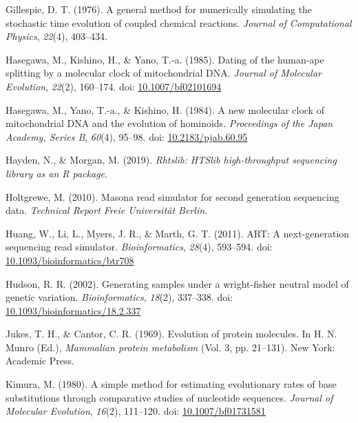 \documentclass[12pt,]{article}
\begin{document}
\leavevmode\hypertarget{ref-Gillespie_1976}{}%
Gillespie, D. T. (1976). A general method for numerically simulating the stochastic time evolution of coupled chemical reactions. \emph{Journal of Computational Physics}, \emph{22}(4), 403--434.

\leavevmode\hypertarget{ref-Hasegawa_1985}{}%
Hasegawa, M., Kishino, H., \& Yano, T.-a. (1985). Dating of the human-ape splitting by a molecular clock of mitochondrial DNA. \emph{Journal of Molecular Evolution}, \emph{22}(2), 160--174. doi: \href{https://doi.org/10.1007/bf02101694}{10.1007/bf02101694}

\leavevmode\hypertarget{ref-Hasegawa_1984}{}%
Hasegawa, M., Yano, T.-a., \& Kishino, H. (1984). A new molecular clock of mitochondrial DNA and the evolution of hominoids. \emph{Proceedings of the Japan Academy, Series B}, \emph{60}(4), 95--98. doi: \href{https://doi.org/10.2183/pjab.60.95}{10.2183/pjab.60.95}

\leavevmode\hypertarget{ref-Hayden_2019}{}%
Hayden, N., \& Morgan, M. (2019). \emph{Rhtslib: HTSlib high-throughput sequencing library as an R package}.

\leavevmode\hypertarget{ref-Holtgrewe_2010}{}%
Holtgrewe, M. (2010). Masona read simulator for second generation sequencing data. \emph{Technical Report Freie Universität Berlin}.

\leavevmode\hypertarget{ref-Huang_2011}{}%
Huang, W., Li, L., Myers, J. R., \& Marth, G. T. (2011). ART: A next-generation sequencing read simulator. \emph{Bioinformatics}, \emph{28}(4), 593--594. doi: \href{https://doi.org/10.1093/bioinformatics/btr708}{10.1093/bioinformatics/btr708}

\leavevmode\hypertarget{ref-Hudson_2002}{}%
Hudson, R. R. (2002). Generating samples under a wright-fisher neutral model of genetic variation. \emph{Bioinformatics}, \emph{18}(2), 337--338. doi: \href{https://doi.org/10.1093/bioinformatics/18.2.337}{10.1093/bioinformatics/18.2.337}

\leavevmode\hypertarget{ref-JC69}{}%
Jukes, T. H., \& Cantor, C. R. (1969). Evolution of protein molecules. In H. N. Munro (Ed.), \emph{Mammalian protein metabolism} (Vol. 3, pp. 21--131). New York: Academic Press.

\leavevmode\hypertarget{ref-Kimura_1980}{}%
Kimura, M. (1980). A simple method for estimating evolutionary rates of base substitutions through comparative studies of nucleotide sequences. \emph{Journal of Molecular Evolution}, \emph{16}(2), 111--120. doi: \href{https://doi.org/10.1007/bf01731581}{10.1007/bf01731581}
\end{document}
